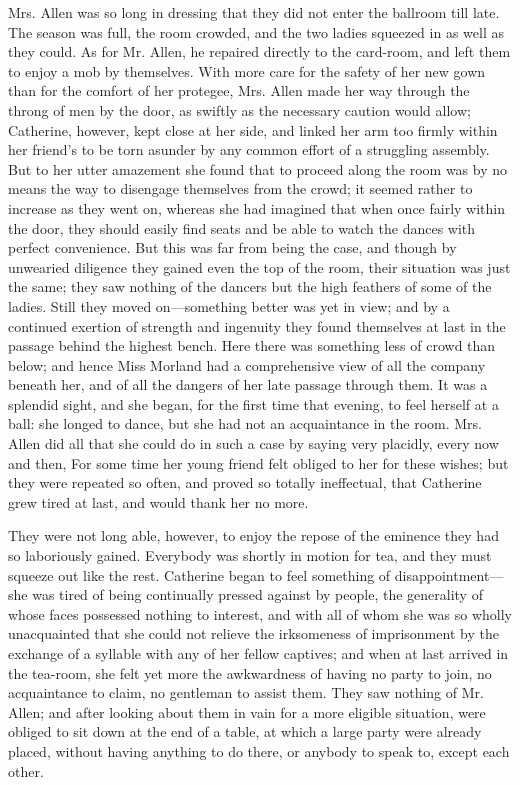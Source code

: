 Mrs. Allen was so long in dressing that they did not enter the ballroom till late. The season was full, the room crowded, and the two ladies squeezed in as well as they could. As for Mr. Allen, he repaired directly to the card-room, and left them to enjoy a mob by themselves. With more care for the safety of her new gown than for the comfort of her protegee, Mrs. Allen made her way through the throng of men by the door, as swiftly as the necessary caution would allow; Catherine, however, kept close at her side, and linked her arm too firmly within her friend's to be torn asunder by any common effort of a struggling assembly. But to her utter amazement she found that to proceed along the room was by no means the way to disengage themselves from the crowd; it seemed rather to increase as they went on, whereas she had imagined that when once fairly within the door, they should easily find seats and be able to watch the dances with perfect convenience. But this was far from being the case, and though by unwearied diligence they gained even the top of the room, their situation was just the same; they saw nothing of the dancers but the high feathers of some of the ladies. Still they moved on---something better was yet in view; and by a continued exertion of strength and ingenuity they found themselves at last in the passage behind the highest bench. Here there was something less of crowd than below; and hence Miss Morland had a comprehensive view of all the company beneath her, and of all the dangers of her late passage through them. It was a splendid sight, and she began, for the first time that evening, to feel herself at a ball: she longed to dance, but she had not an acquaintance in the room. Mrs. Allen did all that she could do in such a case by saying very placidly, every now and then,  For some time her young friend felt obliged to her for these wishes; but they were repeated so often, and proved so totally ineffectual, that Catherine grew tired at last, and would thank her no more.

They were not long able, however, to enjoy the repose of the eminence they had so laboriously gained. Everybody was shortly in motion for tea, and they must squeeze out like the rest. Catherine began to feel something of disappointment---she was tired of being continually pressed against by people, the generality of whose faces possessed nothing to interest, and with all of whom she was so wholly unacquainted that she could not relieve the irksomeness of imprisonment by the exchange of a syllable with any of her fellow captives; and when at last arrived in the tea-room, she felt yet more the awkwardness of having no party to join, no acquaintance to claim, no gentleman to assist them. They saw nothing of Mr. Allen; and after looking about them in vain for a more eligible situation, were obliged to sit down at the end of a table, at which a large party were already placed, without having anything to do there, or anybody to speak to, except each other.

